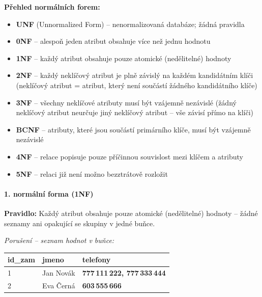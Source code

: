 \textbf{Přehled normálních forem:}
\begin{itemize}
  \item \textbf{UNF} (Unnormalized Form) -- nenormalizovaná databáze; žádná pravidla
  \item \textbf{0NF} -- alespoň jeden atribut obsahuje více než jednu hodnotu
  \item \textbf{1NF} -- každý atribut obsahuje pouze atomické (nedělitelné) hodnoty
  \item \textbf{2NF} -- každý neklíčový atribut je plně závislý na každém kandidátním klíči
    (neklíčový atribut = atribut, který není součástí žádného kandidátního klíče)
  \item \textbf{3NF} -- všechny neklíčové atributy musí být vzájemně nezávislé
    (žádný neklíčový atribut neurčuje jiný neklíčový atribut -- vše závisí přímo na klíči)
  \item \textbf{BCNF} -- atributy, které jsou součástí primárního klíče, musí být vzájemně nezávislé
  \item \textbf{4NF} -- relace popisuje pouze příčinnou souvislost mezi klíčem a atributy
  \item \textbf{5NF} -- relaci již není možno bezztrátově rozložit
\end{itemize}

\paragraph{1. normální forma (1NF)}
\textbf{Pravidlo:} Každý atribut obsahuje pouze atomické (nedělitelné) hodnoty -- žádné seznamy ani opakující se skupiny v jedné buňce.

\smallskip
\textit{Porušení -- seznam hodnot v buňce:}
\begin{center}\footnotesize
\begin{tabular}{lll}
\toprule
id\_zam & jmeno & telefony \\
\midrule
1 & Jan Novák & \textbf{777\,111\,222, 777\,333\,444} \\
2 & Eva Černá & \textbf{603\,555\,666} \\
\bottomrule
\end{tabular}
\end{center}

